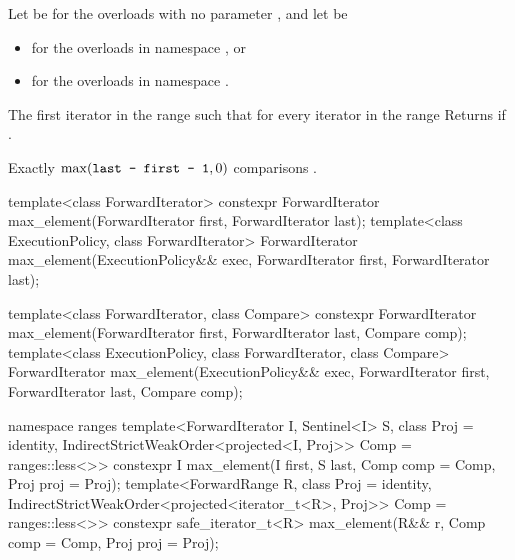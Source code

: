 \begin{itemdescr}
\begin{addedblock}
\pnum
Let  be  for the overloads with no parameter
, and let  be
\begin{itemize}
\item {} for the overloads in namespace , or
\item {} for
  the overloads in namespace .
\end{itemize}
\end{addedblock}

\pnum
\returns
The first iterator
in the range
such that for every iterator
in the range
Returns
if
.

\pnum
\complexity
Exactly
$\max(\texttt{last - first - 1}, 0)$
 comparisons
.
\end{itemdescr}


%
\begin{itemdecl}
template<class ForwardIterator>
  constexpr ForwardIterator max_element(ForwardIterator first, ForwardIterator last);
template<class ExecutionPolicy, class ForwardIterator>
  ForwardIterator max_element(ExecutionPolicy&& exec,
                              ForwardIterator first, ForwardIterator last);

template<class ForwardIterator, class Compare>
  constexpr ForwardIterator max_element(ForwardIterator first, ForwardIterator last,
                                        Compare comp);
template<class ExecutionPolicy, class ForwardIterator, class Compare>
  ForwardIterator max_element(ExecutionPolicy&& exec,
                              ForwardIterator first, ForwardIterator last,
                              Compare comp);
\end{itemdecl}
\begin{addedblock}
\begin{itemdecl}
namespace ranges {
  template<ForwardIterator I, Sentinel<I> S, class Proj = identity,
      IndirectStrictWeakOrder<projected<I, Proj>> Comp = ranges::less<>>
    constexpr I max_element(I first, S last, Comp comp = Comp{}, Proj proj = Proj{});
  template<ForwardRange R, class Proj = identity,
      IndirectStrictWeakOrder<projected<iterator_t<R>, Proj>> Comp = ranges::less<>>
    constexpr safe_iterator_t<R>
      max_element(R&& r, Comp comp = Comp{}, Proj proj = Proj{});
}
\end{itemdecl}
\end{addedblock}

